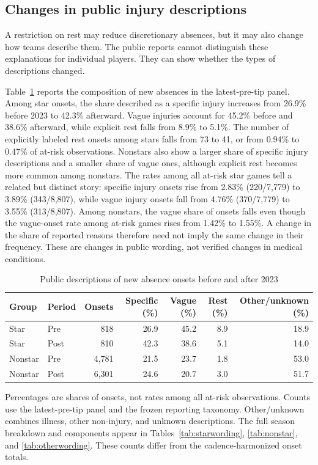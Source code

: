 \documentclass[11pt]{article}
\begin{document}
\FloatBarrier
\subsection{Changes in public injury descriptions}

A restriction on rest may reduce discretionary absences, but it may also change how teams describe them. The public reports cannot distinguish these explanations for individual players. They can show whether the types of descriptions changed.

Table~\ref{tab:wordingshares} reports the composition of new absences in the latest-pre-tip panel. Among star onsets, the share described as a specific injury increases from 26.9\% before 2023 to 42.3\% afterward. Vague injuries account for 45.2\% before and 38.6\% afterward, while explicit rest falls from 8.9\% to 5.1\%. The number of explicitly labeled rest onsets among stars falls from 73 to 41, or from 0.94\% to 0.47\% of at-risk observations. Nonstars also show a larger share of specific injury descriptions and a smaller share of vague ones, although explicit rest becomes more common among nonstars. The rates among all at-risk star games tell a related but distinct story: specific injury onsets rise from 2.83\% (220/7,779) to 3.89\% (343/8,807), while vague injury onsets fall from 4.76\% (370/7,779) to 3.55\% (313/8,807). Among nonstars, the vague share of onsets falls even though the vague-onset rate among at-risk games rises from 1.42\% to 1.55\%. A change in the share of reported reasons therefore need not imply the same change in their frequency. These are changes in public wording, not verified changes in medical conditions.

\begin{table}[!htbp]\centering
\caption{Public descriptions of new absence onsets before and after 2023}\label{tab:wordingshares}
\small\setlength{\tabcolsep}{4pt}
\begin{tabular}{@{}llrrrrr@{}}\toprule
Group & Period & Onsets & Specific (\%) & Vague (\%) & Rest (\%) & Other/unknown (\%)\\\midrule
Star & Pre & 818 & 26.9 & 45.2 & 8.9 & 18.9\\
Star & Post & 810 & 42.3 & 38.6 & 5.1 & 14.0\\
Nonstar & Pre & 4,781 & 21.5 & 23.7 & 1.8 & 53.0\\
Nonstar & Post & 6,301 & 24.6 & 20.7 & 3.0 & 51.7\\\bottomrule
\end{tabular}\par\smallskip\raggedright\footnotesize
Percentages are shares of onsets, not rates among all at-risk observations. Counts use the latest-pre-tip panel and the frozen reporting taxonomy. Other/unknown combines illness, other non-injury, and unknown descriptions. The full season breakdown and components appear in Tables~\ref{tab:starwording}, \ref{tab:nonstar}, and \ref{tab:otherwording}. These counts differ from the cadence-harmonized onset totals.
\end{table}
\end{document}
